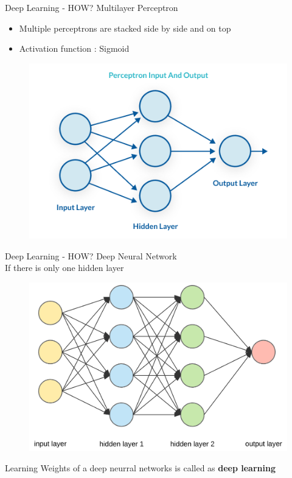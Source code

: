 \begin{frame}[fragile]{Deep Learning - HOW?}
    Multilayer Perceptron
    \begin{itemize}
        \item Multiple perceptrons are stacked side by side and on top
\pause        
        \item Activation function : Sigmoid
    \end{itemize}
    \begin{figure}[ht]
      \hspace*{-1cm}\includegraphics[width=0.5\linewidth]{mlp}
    \end{figure}
\end{frame}

\begin{frame}[fragile]{Deep Learning - HOW?}
    Deep Neural Network \\ 
    If there is only one hidden layer
    \begin{figure}[ht]
      \hspace*{-1cm}\includegraphics[width=0.5\linewidth]{dnn}
    \end{figure}
Learning Weights of a deep neurral networks is called as \textbf{deep learning}
\end{frame}

